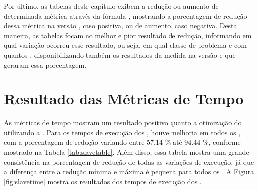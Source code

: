 Por último, as tabelas deste capítulo exibem a redução ou aumento de determinada métrica através da fórmula , mostrando a porcentagem de redução dessa métrica na versão \ASYNC, caso positiva, ou de aumento, caso negativa. Desta maneira, as tabelas focam no melhor e pior resultado de redução, informando em qual variação ocorreu esse resultado, ou seja, em qual classe de problema e com quantos \clusters, disponibilizando também os resultados da medida na versão \IPC e \ASYNC que geraram essa porcentagem.

\section{Resultado das Métricas de Tempo}
\label{sec:metricastempo}

As métricas de tempo mostram um resultado positivo quanto a otimização do \capb utilizando a \API \ASYNC. Para os tempos de execução dos \slaves, houve melhoria em todos os , com a porcentagem de redução variando entre 57.14 \% até 94.44 \%, conforme mostrado na Tabela \ref{tab:slavetable}. Além disso, essa tabela mostra uma grande consistência na porcentagem de redução de todas as variações de execução, já que a diferença entre a redução mínima e máxima é pequena para todos os . A Figura \ref{fig:slavetime} mostra os resultados dos tempos de execução dos \slaves.

\begin{table}[h]
\centering
\caption{Reduções ao comparar-se os tempos dos processos \slaves.}
\label{tab:slavetable}
\end{table}

